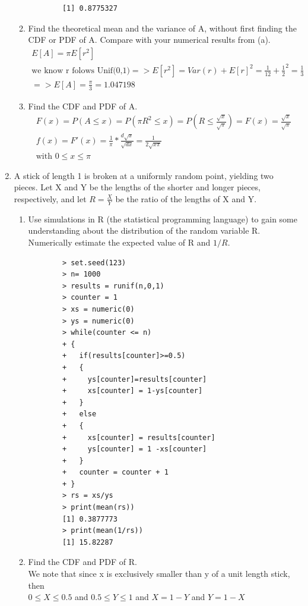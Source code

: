 \documentclass[11pt]{article}
\begin{document}
\begin{enumerate}
\begin{enumerate}
\begin{verbatim}
		[1] 0.8775327
	\end{verbatim}
	\item Find the theoretical mean and the variance of A, without first finding the CDF or PDF of A. Compare
	with your numerical results from (a).
	\begin{gather}
		E[A] = \pi E[r^2]\\
		\text{we know r folows Unif(0,1)} => E[r^2] = Var(r) + E[r]^2 = \frac{1}{12} + \frac{1}{2}^2 = \frac{1}{3}\\
		 => E[A] = \frac{\pi}{3} = 1.047198
	\end{gather}
	\item Find the CDF and PDF of A.
	\begin{gather}
		F(x) = P(A \le x) = P(\pi R^2 \le x) = P(R \le \frac{\sqrt{x}}{\sqrt{\pi}})= F(x) = \frac{\sqrt{x}}{\sqrt{\pi}}\\
		f(x) = F'(x) = \frac{1}{\pi} * \frac{d\sqrt{x}}{\sqrt{dx}} = \frac{1}{2\sqrt{x \pi}}
		\\
		\text{with } 0 \le x \le \pi
	\end{gather}
\end{enumerate}
\item A stick of length 1 is broken at a uniformly random point, yielding two pieces. Let X and Y be the lengths
of the shorter and longer pieces, respectively, and let $R = \frac{X}{Y}$ be the ratio of the lengths of X and Y.
\begin{enumerate}
	\item  Use simulations in R (the statistical programming language) to gain some understanding about the distribution of the random variable R. Numerically estimate the expected value of R and $1/R$.
	\begin{verbatim}
		> set.seed(123)
		> n= 1000
		> results = runif(n,0,1)
		> counter = 1
		> xs = numeric(0)
		> ys = numeric(0)
		> while(counter <= n)
		+ {
		+   if(results[counter]>=0.5)
		+   {
		+     ys[counter]=results[counter]
		+     xs[counter] = 1-ys[counter]
		+   }
		+   else
		+   {
		+     xs[counter] = results[counter]
		+     ys[counter] = 1 -xs[counter]
		+   }
		+   counter = counter + 1
		+ }
		> rs = xs/ys
		> print(mean(rs))
		[1] 0.3877773
		> print(mean(1/rs))
		[1] 15.82287
	\end{verbatim}
	\item Find the CDF and PDF of R.\\
	We note that since x is exclusively smaller than y of a unit length stick, then \\
	$0\le X \le 0.5$ and $0.5 \le Y \le 1$ and $X = 1-Y $ and $Y= 1-X$

\end{enumerate}
\end{enumerate}
\end{document}

